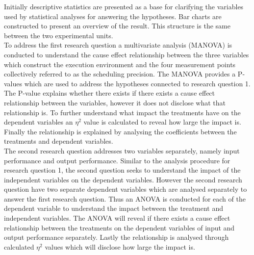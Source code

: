 Initially descriptive statistics are presented as a base for clarifying the variables used by statistical analyses for answering the hypotheses. Bar charts are constructed to present an overview of the result. This structure is the same between the two experimental units.\\

To address the first research question a multivariate analysis (MANOVA) is conducted to understand the cause effect relationship between the three variables which construct the execution environment and the four measurement points collectively referred to as the scheduling precision. The MANOVA provides a P-values which are used to address the hypotheses connected to research question 1. The P-value explains whether there exists if there exists a cause effect relationship between the variables, however it does not disclose what that relationship is. To further understand what impact the treatments have on the dependent variables an $\eta^{2}$ value is calculated to reveal how large the impact is. Finally the relationship is explained by analysing the coefficients between the treatments and dependent variables.\\

The second research question addresses two variables separately, namely input performance and output performance. Similar to the analysis procedure for research question 1, the second question seeks to understand the impact of the independent variables on the dependent variables. However the second research question have two separate dependent variables which are analysed separately to answer the first research question. Thus an ANOVA is conducted for each of the dependent variable to understand the impact between the treatment and independent variables. The ANOVA will reveal if there exists a cause effect relationship between the treatments on the dependent variables of input and output performance separately. Lastly the relationship is analysed through calculated $\eta^{2}$ values which will disclose how large the impact is.\\

